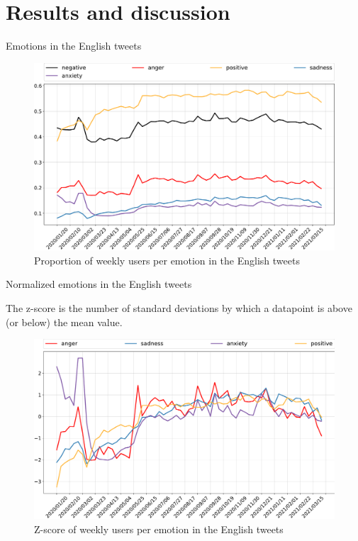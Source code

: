 \documentclass[9pt,aspectratio=1610]{beamer}  %
\begin{document}
\section{Results and discussion}

\begin{frame}{Emotions in the English tweets}

    \begin{figure}[H]
    	\centering
    	\includegraphics[scale=.30]{assets/img/en_5_liwc_categories.svg.pdf}
    	\caption{Proportion of weekly users per emotion in the English tweets}
    	\label{fig:en-5-liwc-categories}
    \end{figure}
    
\end{frame}

\begin{frame}{Normalized emotions in the English tweets}
    
    The z-score is the number of standard deviations by which a datapoint is above (or below) the mean value. 

    \begin{figure}[H]
    	\centering
    	\includegraphics[scale=.28]{assets/img/en_4_liwc_categories_standardized.svg.pdf}
    	\caption{Z-score of weekly users per emotion in the English tweets}
    	\label{fig:en-4-liwc-categories-std}
    \end{figure}
    
\end{frame}
\end{document}
